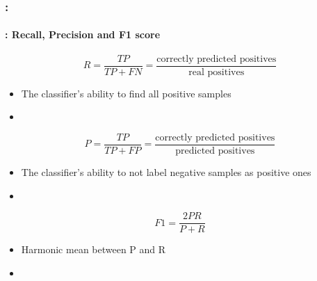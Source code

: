 \documentclass[xcolor=table]{beamer}
\begin{document}
\begin{frame}
	\frametitle{\insertshortsubtitle: \insertsection}
	\framesubtitle{\insertsubsection: Recall, Precision and F1 score}
	
	\vspace{-6pt}
	\[R = \frac{TP}{TP + FN} = \frac{\text{correctly predicted positives}}{\text{real positives}}\]
	
	\begin{itemize}
		\item The classifier's ability to find all positive samples
		\item {}
	\end{itemize}
	
	\vspace{-6pt}
	\[P = \frac{TP}{TP + FP} = \frac{\text{correctly predicted positives}}{\text{predicted positives}}\]
	
	\begin{itemize}
		\item The classifier's ability to not label negative samples as positive ones 
		\item {}
	\end{itemize}
	
	\vspace{-6pt}
	\[F1 = \frac{2 P R}{P + R}\]
	
	\begin{itemize}
		\item Harmonic mean between P and R
		\item {}
	\end{itemize}
	
\end{frame}
\end{document}

